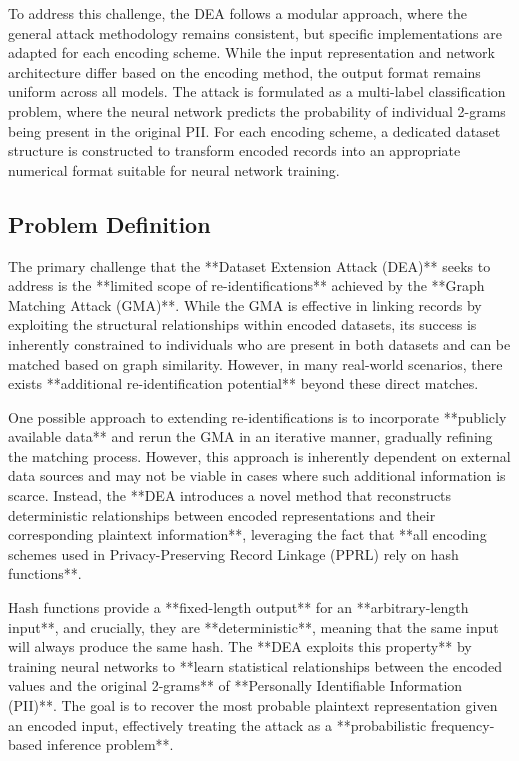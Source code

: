 To address this challenge, the DEA follows a modular approach, where the general attack methodology remains consistent, but specific implementations are adapted for each encoding scheme. While the input representation and network architecture differ based on the encoding method, the output format remains uniform across all models. The attack is formulated as a multi-label classification problem, where the neural network predicts the probability of individual 2-grams being present in the original PII.
For each encoding scheme, a dedicated dataset structure is constructed to transform encoded records into an appropriate numerical format suitable for neural network training.

\subsection{Problem Definition} \label{sec:problemdefinition}

The primary challenge that the **Dataset Extension Attack (DEA)** seeks to address is the **limited scope of re-identifications** achieved by the **Graph Matching Attack (GMA)**. While the GMA is effective in linking records by exploiting the structural relationships within encoded datasets, its success is inherently constrained to individuals who are present in both datasets and can be matched based on graph similarity. However, in many real-world scenarios, there exists **additional re-identification potential** beyond these direct matches.

One possible approach to extending re-identifications is to incorporate **publicly available data** and rerun the GMA in an iterative manner, gradually refining the matching process. However, this approach is inherently dependent on external data sources and may not be viable in cases where such additional information is scarce. Instead, the **DEA introduces a novel method that reconstructs deterministic relationships between encoded representations and their corresponding plaintext information**, leveraging the fact that **all encoding schemes used in Privacy-Preserving Record Linkage (PPRL) rely on hash functions**.

Hash functions provide a **fixed-length output** for an **arbitrary-length input**, and crucially, they are **deterministic**, meaning that the same input will always produce the same hash. The **DEA exploits this property** by training neural networks to **learn statistical relationships between the encoded values and the original 2-grams** of **Personally Identifiable Information (PII)**. The goal is to recover the most probable plaintext representation given an encoded input, effectively treating the attack as a **probabilistic frequency-based inference problem**.

